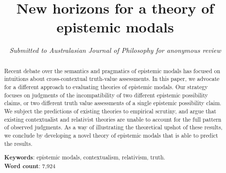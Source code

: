\documentclass[11pt]{article}
\author{ {\it Submitted to Australasian Journal of Philosophy for anonymous review}
 }
\date{}
\title{New horizons for a theory of epistemic modals}
\begin{document}
\maketitle

\begin{abstract}\noindent Recent debate over the semantics and pragmatics of epistemic modals has focused on intuitions about cross-contextual truth-value assessments. In this paper, we advocate for a different approach to evaluating theories of epistemic modals. Our strategy focuses on judgments of the incompatibility of two different epistemic possibility claims, or two different truth value assessments of a single epistemic possibility claim. We subject the predictions of existing theories to empirical scrutiny, and argue that existing contextualist and relativist theories are unable to account for the full pattern of observed judgments. As a way of illustrating the theoretical upshot of these results, we conclude by developing a novel theory of epistemic modals that is able to predict the results. \begin{center} {\bf Keywords}: epistemic modals, contextualism, relativism, truth.\\ {\bf Word count}: 7,924 \end{center}\end{abstract}
\end{document}
